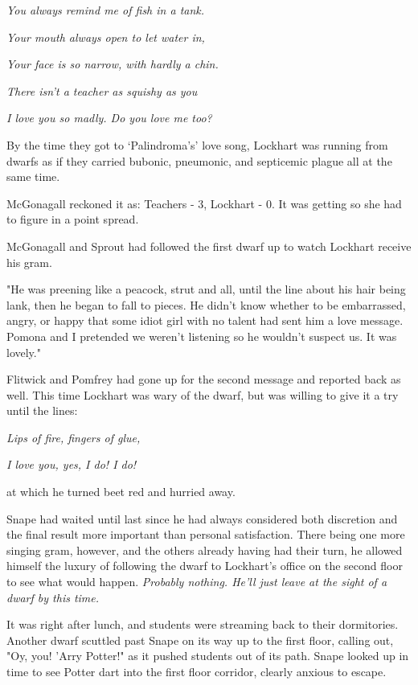 \documentclass[a4paper,11pt]{article}
\begin{document}
\emph{You always remind me of fish in a tank.}

\emph{Your mouth always open to let water in,}

\emph{Your face is so narrow, with hardly a chin.}

\emph{There isn't a teacher as squishy as you}

\emph{I love you so madly. Do you love me too?}

By the time they got to `Palindroma's' love song, Lockhart was running from dwarfs as if they carried bubonic, pneumonic, and septicemic plague all at the same time.

McGonagall reckoned it as: Teachers - 3, Lockhart - 0. It was getting so she had to figure in a point spread.

McGonagall and Sprout had followed the first dwarf up to watch Lockhart receive his gram.

"He was preening like a peacock, strut and all, until the line about his hair being lank, then he began to fall to pieces. He didn't know whether to be embarrassed, angry, or happy that some idiot girl with no talent had sent him a love message. Pomona and I pretended we weren't listening so he wouldn't suspect us. It was lovely."

Flitwick and Pomfrey had gone up for the second message and reported back as well. This time Lockhart was wary of the dwarf, but was willing to give it a try until the lines:

\emph{Lips of fire, fingers of glue,}

\emph{I love you, yes, I do! I do!}

at which he turned beet red and hurried away.

Snape had waited until last since he had always considered both discretion and the final result more important than personal satisfaction. There being one more singing gram, however, and the others already having had their turn, he allowed himself the luxury of following the dwarf to Lockhart's office on the second floor to see what would happen. \emph{Probably nothing. He'll just leave at the sight of a dwarf by this time.}

It was right after lunch, and students were streaming back to their dormitories. Another dwarf scuttled past Snape on its way up to the first floor, calling out, "Oy, you! 'Arry Potter!" as it pushed students out of its path. Snape looked up in time to see Potter dart into the first floor corridor, clearly anxious to escape.
\end{document}
